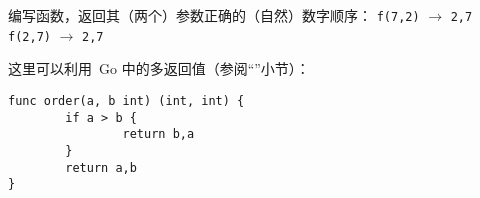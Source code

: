 \begin{Exercise}[title={整数顺序},difficulty=3]
\label{ex:ordering function}
\Question 编写函数，返回其（两个）参数正确的（自然）数字顺序：
\newline 
\lstinline{f(7,2)} $\rightarrow$ \lstinline{2,7}\newline
\lstinline{f(2,7)} $\rightarrow$ \lstinline{2,7}\newline
\end{Exercise}

\begin{Answer}
\Question 
这里可以利用~Go 中的多返回值（参阅``''小节）：
\begin{lstlisting}
func order(a, b int) (int, int) {
        if a > b { 
                return b,a 
        }   
        return a,b 
}
\end{lstlisting}

\end{Answer}
